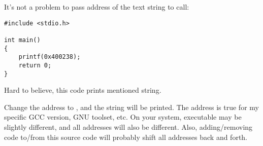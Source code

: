 It's not a problem to pass address of the text string  to  call:

\begin{lstlisting}[style=customc]
#include <stdio.h>

int main()
{
    printf(0x400238);
    return 0;
}
\end{lstlisting}

Hard to believe, this code prints mentioned string.

Change the address to , and the  string will be printed.
The address is true for my specific GCC version, GNU toolset, etc.
On your system, executable may be slightly different, and all addresses will also be different.
Also, adding/removing code to/from this source code will probably shift all addresses back and forth.

